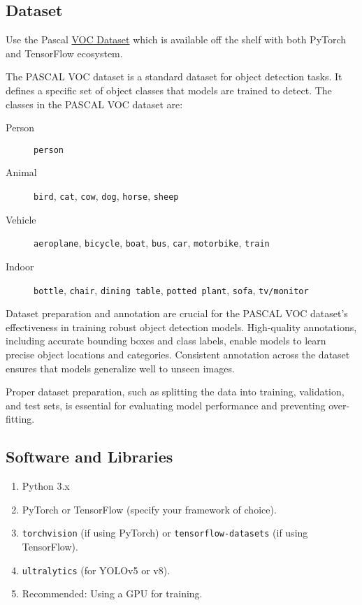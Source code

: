 \documentclass[11pt]{article}
\begin{document}
\subsection{Dataset}
\label{sec:org9b22834}
Use the Pascal \href{http://host.robots.ox.ac.uk/pascal/VOC/}{VOC Dataset} which is available off the
shelf with both PyTorch and TensorFlow ecosystem.

The PASCAL VOC dataset is a standard dataset for object detection tasks. It defines a specific set of object classes that models are trained to detect. The classes in the PASCAL VOC dataset are:

\begin{description}
\item[{Person}] \texttt{person}
\item[{Animal}] \texttt{bird}, \texttt{cat}, \texttt{cow}, \texttt{dog}, \texttt{horse},
\texttt{sheep}
\item[{Vehicle}] \texttt{aeroplane}, \texttt{bicycle}, \texttt{boat}, \texttt{bus},
\texttt{car}, \texttt{motorbike}, \texttt{train}
\item[{Indoor}] \texttt{bottle}, \texttt{chair}, \texttt{dining table}, \texttt{potted
  plant}, \texttt{sofa}, \texttt{tv/monitor}
\end{description}

Dataset preparation and annotation are crucial for the
PASCAL VOC dataset's effectiveness in training robust
object detection models. High-quality annotations,
including accurate bounding boxes and class labels,
enable models to learn precise object locations and
categories. Consistent annotation across the dataset
ensures that models generalize well to unseen images.

Proper dataset preparation, such as splitting the data
into training, validation, and test sets, is essential
for evaluating model performance and preventing
over-fitting.

\subsection{Software and Libraries}
\label{sec:org799282d}

\begin{enumerate}
\item Python 3.x
\item PyTorch or TensorFlow (specify your framework of
choice).
\item \texttt{torchvision} (if using PyTorch) or
\texttt{tensorflow-datasets} (if using TensorFlow).
\item \texttt{ultralytics} (for YOLOv5 or v8).
\item Recommended: Using a GPU for training.
\end{enumerate}
\end{document}
